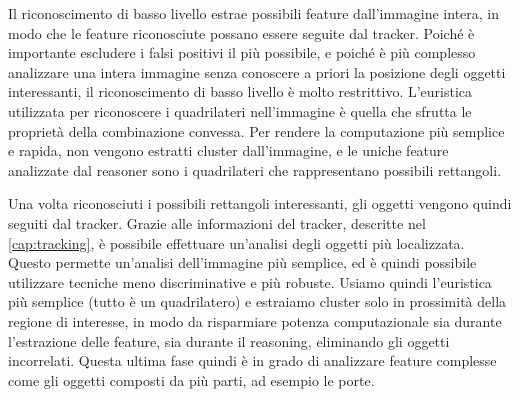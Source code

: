 Il riconoscimento di basso livello estrae possibili feature dall'immagine intera, in modo che le feature riconosciute possano essere seguite dal tracker. Poiché è importante escludere i falsi positivi il più possibile, e poiché è più complesso analizzare una intera immagine senza conoscere a priori la posizione degli oggetti interessanti, il riconoscimento di basso livello è molto restrittivo. L'euristica utilizzata per riconoscere i quadrilateri nell'immagine è quella che sfrutta le proprietà della combinazione convessa.
Per rendere la computazione più semplice e rapida, non vengono estratti cluster dall'immagine, e le uniche feature analizzate dal reasoner sono i quadrilateri che rappresentano possibili rettangoli.

Una volta riconosciuti i possibili rettangoli interessanti, gli oggetti vengono quindi seguiti dal tracker. Grazie alle informazioni del tracker, descritte nel \autoref{cap:tracking}, è possibile effettuare un'analisi degli oggetti più localizzata. Questo permette un'analisi dell'immagine più semplice, ed è quindi possibile utilizzare tecniche meno discriminative e più robuste. Usiamo quindi l'euristica più semplice (tutto è un quadrilatero) e estraiamo cluster solo in prossimità della regione di interesse, in modo da risparmiare potenza computazionale sia durante l'estrazione delle feature, sia durante il reasoning, eliminando gli oggetti incorrelati. Questa ultima fase quindi è in grado di analizzare feature complesse come gli oggetti composti da più parti, ad esempio le porte.

